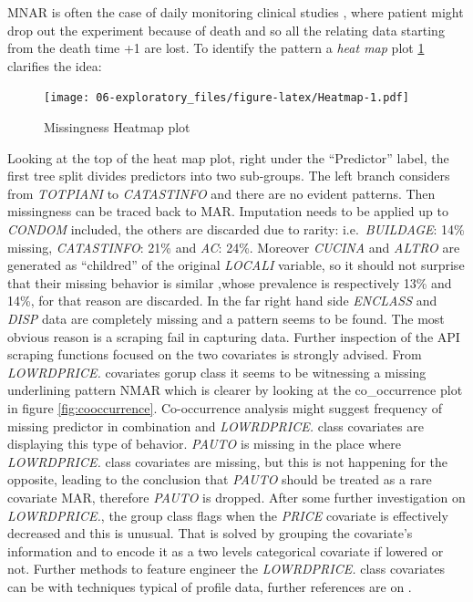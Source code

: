 \documentclass[
  12pt,
  a4paper,
  oneside]{book}
\theoremstyle{definition}
\theoremstyle{definition}
\theoremstyle{definition}
\theoremstyle{remark}
\begin{document}
MNAR is often the case of daily monitoring clinical studies \citep{Kuhn}, where patient might drop out the experiment because of death and so all the relating data starting from the death time +1 are lost.
To identify the pattern a \emph{heat map} plot \ref{fig:Heatmap} clarifies the idea:

\begin{figure}
\centering
\texttt{[image: 06-exploratory\_files/figure-latex/Heatmap-1.pdf]}
\caption{\label{fig:Heatmap}Missingness Heatmap plot}
\end{figure}

Looking at the top of the heat map plot, right under the ``Predictor'' label, the first tree split divides predictors into two sub-groups. The left branch considers from \emph{TOTPIANI} to \emph{CATASTINFO} and there are no evident patterns. Then missingness can be traced back to MAR. Imputation needs to be applied up to \emph{CONDOM} included, the others are discarded due to rarity: i.e.~\emph{BUILDAGE}: 14\% missing, \emph{CATASTINFO}: 21\% and \emph{AC}: 24\%. Moreover \emph{CUCINA} and \emph{ALTRO} are generated as ``childred'' of the original \emph{LOCALI} variable, so it should not surprise that their missing behavior is similar ,whose prevalence is respectively 13\% and 14\%, for that reason are discarded.
In the far right hand side \emph{ENCLASS} and \emph{DISP} data are completely missing and a pattern seems to be found. The most obvious reason is a scraping fail in capturing data. Further inspection of the API scraping functions focused on the two covariates is strongly advised. From \emph{LOWRDPRICE.} covariates gorup class it seems to be witnessing a missing underlining pattern NMAR which is clearer by looking at the co\_occurrence plot in figure \ref{fig:cooccurrence}. Co-occurrence analysis might suggest frequency of missing predictor in combination and \emph{LOWRDPRICE.} class covariates are displaying this type of behavior. \emph{PAUTO} is missing in the place where \emph{LOWRDPRICE.} class covariates are missing, but this is not happening for the opposite, leading to the conclusion that \emph{PAUTO} should be treated as a rare covariate MAR, therefore \emph{PAUTO} is dropped.
After some further investigation on \emph{LOWRDPRICE.}, the group class flags when the \emph{PRICE} covariate is effectively decreased and this is unusual. That is solved by grouping the covariate's information and to encode it as a two levels categorical covariate if lowered or not. Further methods to feature engineer the \emph{LOWRDPRICE.} class covariates can be with techniques typical of profile data, further references are on \citet{Kuhn}.
\end{document}
